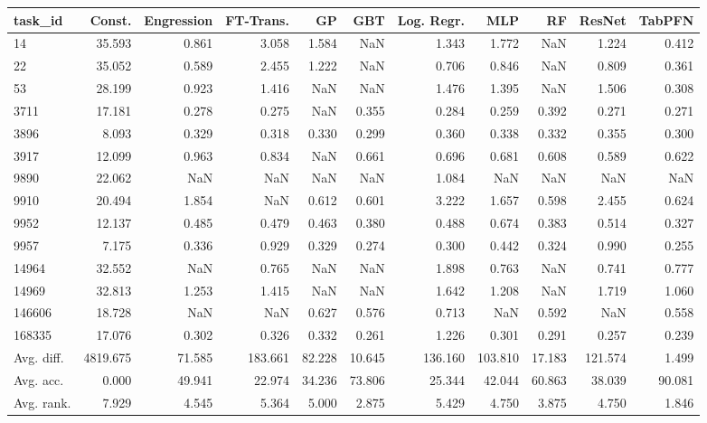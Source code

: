 \begin{tabular}{lrrrrrrrrrr}
\toprule
task\_id & Const. & Engression & FT-Trans. & GP & GBT & Log. Regr. & MLP & RF & ResNet & TabPFN \\
\midrule
14 & 35.593 & 0.861 & 3.058 & 1.584 & NaN & 1.343 & 1.772 & NaN & 1.224 & 0.412 \\
22 & 35.052 & 0.589 & 2.455 & 1.222 & NaN & 0.706 & 0.846 & NaN & 0.809 & 0.361 \\
53 & 28.199 & 0.923 & 1.416 & NaN & NaN & 1.476 & 1.395 & NaN & 1.506 & 0.308 \\
3711 & 17.181 & 0.278 & 0.275 & NaN & 0.355 & 0.284 & 0.259 & 0.392 & 0.271 & 0.271 \\
3896 & 8.093 & 0.329 & 0.318 & 0.330 & 0.299 & 0.360 & 0.338 & 0.332 & 0.355 & 0.300 \\
3917 & 12.099 & 0.963 & 0.834 & NaN & 0.661 & 0.696 & 0.681 & 0.608 & 0.589 & 0.622 \\
9890 & 22.062 & NaN & NaN & NaN & NaN & 1.084 & NaN & NaN & NaN & NaN \\
9910 & 20.494 & 1.854 & NaN & 0.612 & 0.601 & 3.222 & 1.657 & 0.598 & 2.455 & 0.624 \\
9952 & 12.137 & 0.485 & 0.479 & 0.463 & 0.380 & 0.488 & 0.674 & 0.383 & 0.514 & 0.327 \\
9957 & 7.175 & 0.336 & 0.929 & 0.329 & 0.274 & 0.300 & 0.442 & 0.324 & 0.990 & 0.255 \\
14964 & 32.552 & NaN & 0.765 & NaN & NaN & 1.898 & 0.763 & NaN & 0.741 & 0.777 \\
14969 & 32.813 & 1.253 & 1.415 & NaN & NaN & 1.642 & 1.208 & NaN & 1.719 & 1.060 \\
146606 & 18.728 & NaN & NaN & 0.627 & 0.576 & 0.713 & NaN & 0.592 & NaN & 0.558 \\
168335 & 17.076 & 0.302 & 0.326 & 0.332 & 0.261 & 1.226 & 0.301 & 0.291 & 0.257 & 0.239 \\
Avg. diff. & 4819.675 & 71.585 & 183.661 & 82.228 & 10.645 & 136.160 & 103.810 & 17.183 & 121.574 & 1.499 \\
Avg. acc. & 0.000 & 49.941 & 22.974 & 34.236 & 73.806 & 25.344 & 42.044 & 60.863 & 38.039 & 90.081 \\
Avg. rank. & 7.929 & 4.545 & 5.364 & 5.000 & 2.875 & 5.429 & 4.750 & 3.875 & 4.750 & 1.846 \\
\bottomrule
\end{tabular}
